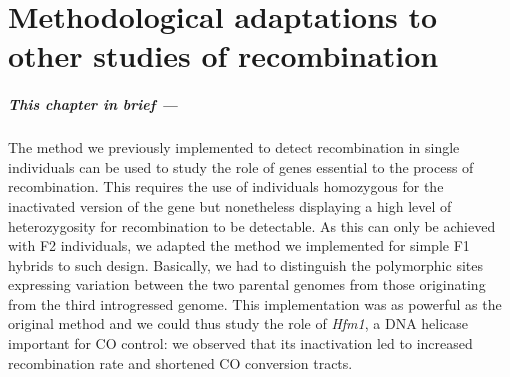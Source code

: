\chapter{\label{ch:8-HFM1}Methodological adaptations to other studies of recombination}



\minitoc{}

{\small{} \itshape{}

\paragraph{This chapter in brief —}

The method we previously implemented to detect recombination in single individuals can be used to study the role of genes essential to the process of recombination.
This requires the use of individuals homozygous for the inactivated version of the gene but nonetheless displaying a high level of heterozygosity for recombination to be detectable.
As this can only be achieved with F2 individuals,
%
we adapted the method we implemented for simple F1 hybrids to such design.
Basically, we had to distinguish the polymorphic sites expressing variation between the two parental genomes from those originating from the third introgressed genome.
This implementation was as powerful as the original method and we could thus study the role of \textit{Hfm1}, a DNA helicase important for CO control: we observed that its inactivation led to increased recombination rate and shortened CO conversion tracts.

}

